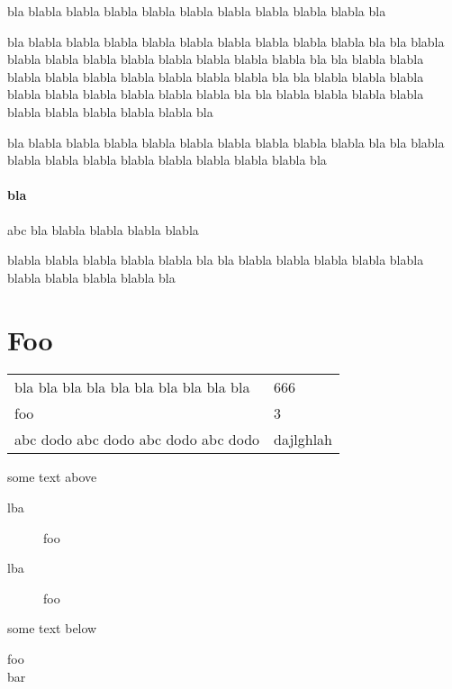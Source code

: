 \documentclass{article}
\renewenvironment{quote}
               {\list{}{\rightmargin\leftmargin}%
                \item\relax \LDBupdateBegin{quote}}%
               {\endlist\LDBupdateEnd{quote}}
\begin{document}
\begin{quote}
bla blabla blabla blabla blabla blabla blabla blabla blabla blabla bla

bla blabla blabla blabla blabla blabla blabla blabla blabla blabla bla
bla blabla blabla blabla blabla blabla blabla blabla blabla blabla bla
\end{quote}
bla blabla blabla blabla blabla blabla blabla blabla blabla blabla bla
bla blabla blabla blabla blabla blabla blabla blabla blabla blabla bla
bla blabla blabla blabla blabla blabla blabla blabla blabla blabla bla

bla blabla blabla blabla blabla blabla blabla blabla blabla blabla bla
bla blabla blabla blabla blabla blabla blabla blabla blabla blabla bla

\subsection{bla}

abc
bla blabla blabla blabla blabla 

blabla blabla blabla blabla blabla bla
bla blabla blabla blabla blabla blabla blabla blabla blabla blabla bla


\part{Foo}

\begin{center}
\begin{tabular}{p{5cm}l}
  bla bla  bla bla  bla bla  bla bla  bla bla & 666 \\
  foo & 3 \\
abc dodo
abc dodo
abc dodo
abc dodo & dajlghlah
\end{tabular}
\end{center}

some text above
\begin{description}
\item[lba] foo
\item[lba] foo
\end{description}
some text below

\begin{center}
foo \\
bar
\end{center}
\end{document}
